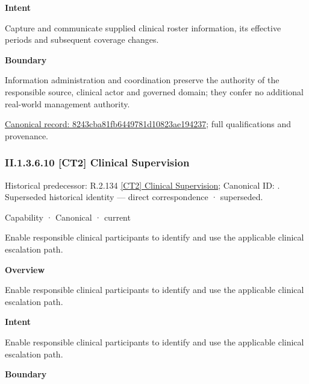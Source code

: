 \textbf{Intent}



Capture and communicate supplied clinical roster information, its effective periods and subsequent coverage changes.



\textbf{Boundary}



Information administration and coordination preserve the authority of the responsible source, clinical actor and governed domain; they confer no additional real-world management authority.


{\footnotesize \href{../../../../continuum/strategy/capability/8243cba81fb6449781d10823ae194237.md}{Canonical record: 8243cba81fb6449781d10823ae194237}; full qualifications and provenance.}\par
\subsubsection*{II.1.3.6.10 [CT2] Clinical Supervision}
\label{navigation:II.1.3.6.10}

{\small Historical predecessor: R.2.134 \hyperref[element:50c838981f3946d78e8f78d18e31c70c]{[CT2] Clinical Supervision}; Canonical ID: \texttt{}. Superseded historical identity — direct correspondence · superseded.}\par
\label{element:f697b1ac79b544749315f31819b17969}
{\small Capability · Canonical · current}\par

Enable responsible clinical participants to identify and use the applicable clinical escalation path.



\textbf{Overview}



Enable responsible clinical participants to identify and use the applicable clinical escalation path.



\textbf{Intent}



Enable responsible clinical participants to identify and use the applicable clinical escalation path.



\textbf{Boundary}



